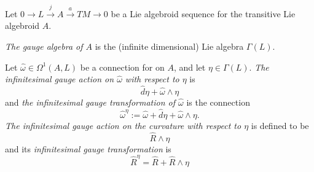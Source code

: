 



Let $0 \to L \xrightarrow{j} A \xrightarrow{a} TM \to 0$ be a Lie algebroid sequence for the transitive Lie algebroid $A$.

\begin{definition}
\emph{The gauge algebra of $A$} is the (infinite dimensional) Lie algebra $\Gamma(L)$.
\end{definition}

\begin{definition}\label{definitionInfinitesimalGaugeActionAndTransformationForAlgebroidFormsAndCurvature}
Let $\hat \omega \in \Omega^1(A, L)$ be a connection for on $A$, and let $\eta \in \Gamma(L)$. \emph{The infinitesimal gauge action on $\hat \omega$ with respect to $\eta$} is 
\begin{equation}
    \hat d \eta + \hat \omega \wedge \eta
\end{equation}
and \emph{the infinitesimal gauge transformation of $\hat \omega$} is the connection
\begin{equation}
    \hat \omega^\eta := \hat \omega + \hat d \eta + \hat \omega \wedge \eta.
\end{equation}
\emph{The infinitesimal gauge action on the curvature with respect to $\eta$} is defined to be
\begin{equation}
    \hat R \wedge \eta
\end{equation}
and its \emph{infinitesimal gauge transformation} is
\begin{equation}
    \hat R^\eta = \hat R + \hat R \wedge \eta
\end{equation}
\end{definition}

